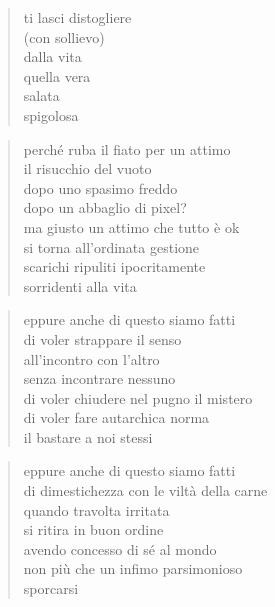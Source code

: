 \begin{poem}
\begin{poem}
	\begin{verse}
                ti lasci distogliere\\
                (con sollievo)\\
                dalla vita\\
                quella vera\\
                salata\\
                spigolosa
	\end{verse}

\clearpage


	\begin{verse}
		perché ruba il fiato per un attimo\\
		il risucchio del vuoto\\
		dopo uno spasimo freddo\\
		dopo un abbaglio di pixel?\\
		ma giusto un attimo che tutto è ok\\
		si torna all'ordinata gestione\\
		scarichi ripuliti ipocritamente\\
		sorridenti alla vita
	\end{verse}

	\begin{verse}
		eppure anche di questo siamo fatti\\
		di voler strappare il senso\\
		all'incontro con l'altro\\
		senza incontrare nessuno\\
		di voler chiudere nel pugno il mistero\\
		di voler fare autarchica norma\\
		il bastare a noi stessi
	\end{verse}

	\begin{verse}
		eppure anche di questo siamo fatti\\
		di dimestichezza con le viltà della carne\\
		quando travolta irritata\\
		si ritira in buon ordine\\
		avendo concesso di sé al mondo\\
		non più che un infimo parsimonioso\\
		sporcarsi
	\end{verse}

\clearpage


\end{poem}
\end{poem}
